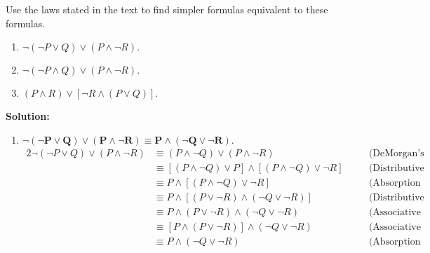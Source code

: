 Use the laws stated in the text to find simpler formulas equivalent to these formulas.
\begin{enumerate}[label=(\alph*)]
    \item $\neg (\neg P \vee Q) \vee (P \wedge \neg R).$
    \item $\neg (\neg P \wedge Q) \vee (P \wedge \neg R).$
    \item $(P \wedge R) \vee [\neg R \wedge (P \vee Q)].$
\end{enumerate}

\textbf{Solution:}
\begin{enumerate}[label=(\alph*)]
    \item \textbf{$\bm{\neg (\neg P \vee Q) \vee (P \wedge \neg R) \equiv P \wedge (\neg Q \vee \neg R).}$}
        \begin{alignat*}{2}
            \neg (\neg P \vee Q) \vee (P \wedge \neg R) & \equiv (P \wedge \neg Q) \vee (P \wedge \neg R) && \quad \text{(DeMorgan's Law)} \\
            & \equiv [(P \wedge \neg Q) \vee P] \wedge [(P \wedge \neg Q) \vee \neg R]&& \quad \text{(Distributive Law)} \\
            & \equiv P \wedge [(P \wedge \neg Q) \vee \neg R]&& \quad \text{(Absorption Law)} \\
            & \equiv P \wedge [(P \vee \neg R) \wedge (\neg Q \vee \neg R)]&& \quad \text{(Distributive Law)} \\
            & \equiv P \wedge (P \vee \neg R) \wedge (\neg Q \vee \neg R)&& \quad \text{(Associative Law)} \\
            & \equiv [P \wedge (P \vee \neg R)] \wedge (\neg Q \vee \neg R)&& \quad \text{(Associative Law)} \\
            & \equiv P \wedge (\neg Q \vee \neg R)&& \quad \text{(Absorption Law)} \\
        \end{alignat*}


\end{enumerate}
